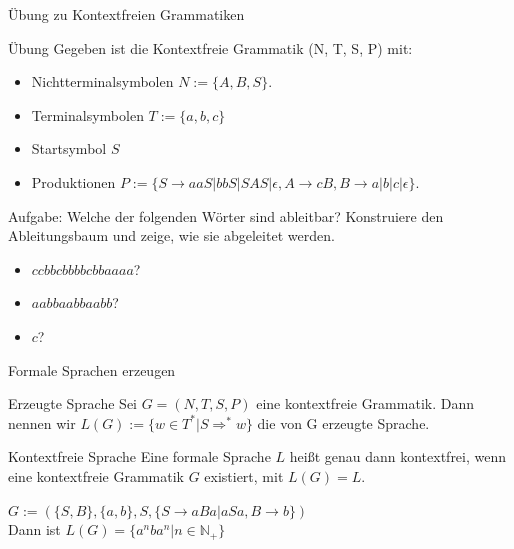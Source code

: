 \documentclass[handout]{beamer}
\begin{document}
\begin{frame}{Übung zu Kontextfreien Grammatiken}
	\begin{taskblock}{Übung}
		Gegeben ist die Kontextfreie Grammatik (N, T, S, P) mit:
		
		\begin{itemize}
			\item Nichtterminalsymbolen $N := \{A, B, S\}$.
			\item Terminalsymbolen $T := \{a, b, c\}$
			\item Startsymbol $S$
			\item Produktionen $P := \{S \rightarrow aaS | bbS | SAS | \epsilon, A \rightarrow cB , B \rightarrow a | b| c | \epsilon\}$.
		\end{itemize}
	
		\bp
	
		Aufgabe: Welche der folgenden Wörter sind ableitbar? Konstruiere den Ableitungsbaum und zeige, wie sie abgeleitet werden.
		
		\begin{itemize}
			\item $ccbbcbbbbcbbaaaa$? %
			\item $aabbaabbaabb$? %
			\item $c$?
		\end{itemize}
	\end{taskblock}
\end{frame}

\begin{frame}{Formale Sprachen erzeugen}
	\begin{block}{Erzeugte Sprache}
		Sei $G = (N, T, S, P)$ eine kontextfreie Grammatik. Dann nennen wir $L(G) := \{w \in T^*| S \Rightarrow^* w\}$ die von G erzeugte Sprache.
	\end{block}

	\bp
	
	\begin{block}{Kontextfreie Sprache}
		Eine formale Sprache $L$ heißt genau dann kontextfrei, wenn eine kontextfreie Grammatik $G$ existiert, mit $L(G) = L$.
	\end{block}

	\bp

	$G:= (\{S,B\}, \{a,b\}, S, \{S \rightarrow aBa|aSa, B \rightarrow b\})$\\\vspace{.3cm}
	\ip Dann ist $L(G) = \{a^nba^n|n \in \mathbb{N_+}\}$
\end{frame}
\end{document}
